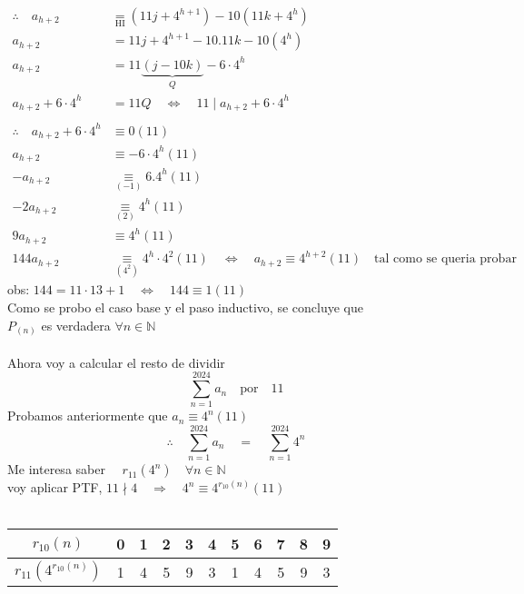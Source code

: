 \documentclass[12pt,a4paper]{article}
\begin{document}
\begin{align*}  
\therefore \quad a_{h+2} &\underset{\scriptscriptstyle\text{HI}}{=} (11j + 4^{h+1}) - 10(11k + 4^h) \\
    a_{h+2} &= 11j + 4^{h+1} - 10.11k - 10(4^h) \\
    a_{h+2} &= 11 \underbrace{(j - 10k)}_{Q} - 6 \cdot 4^h \\
    a_{h+2} +6 \cdot 4^h &= 11Q \quad \Longleftrightarrow \quad 11 \mid a_{h+2} +6 \cdot 4^h \\ \\
    \therefore \quad a_{h+2} +6 \cdot 4^h &\equiv 0 (11)\\
    a_{h+2} &\equiv -6 \cdot 4^h (11) \\
    -a_{h+2} &\underset{\scriptscriptstyle(-1)}{\equiv}  6.4^h (11) \\
    -2a_{h+2} &\underset{\scriptscriptstyle(2)}{\equiv} 4^h (11) \\
    9a_{h+2} &\equiv 4^h (11) \\
    144a_{h+2} &\underset{\scriptscriptstyle(4^2)}{\equiv}  4^h \cdot 4^2 (11) \quad
    \Longleftrightarrow \quad  a_{h+2} \equiv 4^{h+2} (11) \quad 
    \text{tal como se queria probar} 
\end{align*}
obs: $144 = 11 \cdot 13 + 1 \quad \Longleftrightarrow   \quad 144 \equiv 1 (11)$ \\
Como se probo el caso base y el paso inductivo, se concluye que \\
$P_{(n)}$ es verdadera $\forall n \in \mathbb{N}$ \\ \\
Ahora voy a calcular el resto de dividir \\
\begin{equation*}
\sum_{n=1}^{2024} a_n \quad \text{por} \quad 11
\end{equation*}
Probamos anteriormente  que $a_n \equiv 4^n (11)$ \\
\begin{equation*}
\therefore \quad \sum_{n=1}^{2024}a_n  \quad = \quad  \sum_{n=1}^{2024} 4^n
\end{equation*}
Me interesa saber $ \quad r_{\scriptscriptstyle 11} (4^n)  \quad \forall n \in \mathbb{N}$ \\
voy aplicar PTF, $11 \nmid 4 \quad \Longrightarrow \quad 4^n \equiv 4^{r_{\scriptscriptstyle 10} (n)} (11)$ \\ \\
\begin{tabular}{|c|c|c|c|c|c|c|c|c|c|c|}
    \hline
    $r_{10}(n) $ & 0 & 1 & 2 & 3 & 4 & 5 & 6 & 7 & 8 & 9 \\
    \hline
    $r_{11}(4^{r_{10}(n)})$ & 1 & 4 & 5 & 9 & 3 & 1 & 4 & 5 & 9 & 3 \\
    \hline
\end{tabular} \\ \\ \\
\end{document}
